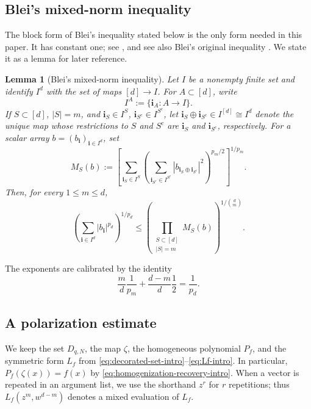 \documentclass[11pt,a4paper]{article}
\numberwithin{equation}{section}
\theoremstyle{cleanplain}
\newtheorem{lemma}[lemma]{Lemma}
\theoremstyle{cleandefinition}
\theoremstyle{cleanremark}
\begin{document}
\subsection{Blei's mixed-norm inequality}\label{sec:blei}

{\color{black}
The block form of Blei's inequality stated below is the only form needed in
this paper.  It has constant one; see \cite[Theorem~2.1]{BPSS}, and see also
Blei's original inequality \cite{Blei}.  We state it as a lemma for later
reference.

\begin{lemma}[Blei's mixed-norm inequality]\label{lem:blei-block}
Let $I$ be a nonempty finite set and identify $I^d$ with the set of maps
$[d]\to I$.  For $A\subset[d]$, write
\[
 I^A:=\{\mathbf i_A:A\to I\}.
\]
If $S\subset[d]$, $|S|=m$, and
$\mathbf i_S\in I^S$, $\mathbf i_{S^c}\in I^{S^c}$, let
$\mathbf i_S\oplus\mathbf i_{S^c}\in I^{[d]}\cong I^d$ denote the unique
map whose restrictions to $S$ and $S^c$ are $\mathbf i_S$ and
$\mathbf i_{S^c}$, respectively.  For a scalar array
$b=(b_{\mathbf i})_{\mathbf i\in I^d}$, set
\[
 M_S(b):=
 \left[
 \sum_{\mathbf i_S\in I^S}
 \left(
 \sum_{\mathbf i_{S^c}\in I^{S^c}}
 |b_{\mathbf i_S\oplus\mathbf i_{S^c}}|^2
 \right)^{p_m/2}
 \right]^{1/p_m}.
\]
Then, for every $1\le m\le d$,
\begin{equation}\label{eq:blei-body}
 \left(\sum_{\mathbf i\in I^d}|b_{\mathbf i}|^{p_d}\right)^{1/p_d}
 \leq
 \left(
 \prod_{\substack{S\subset[d]\\ |S|=m}}M_S(b)
 \right)^{1/\binom dm}.
\end{equation}
\end{lemma}

The exponents are calibrated by the identity
\[
 \frac md\frac1{p_m}+\frac{d-m}{d}\frac12
 =\frac1{p_d}.
\]
}

\subsection{A polarization estimate}\label{sec:polarization}

{\color{black}We keep the set $D_{q,N}$, the map $\zeta$, the homogeneous
polynomial $P_f$, and the symmetric form $L_f$ from
\eqref{eq:decorated-set-intro}--\eqref{eq:Lf-intro}.  In particular,
$P_f(\zeta(x))=f(x)$ by \eqref{eq:homogenization-recovery-intro}.  When a
vector is repeated in an argument list, we use the shorthand $z^r$ for $r$
repetitions; thus $L_f(z^m,w^{d-m})$ denotes a mixed evaluation of $L_f$.}
\end{document}

